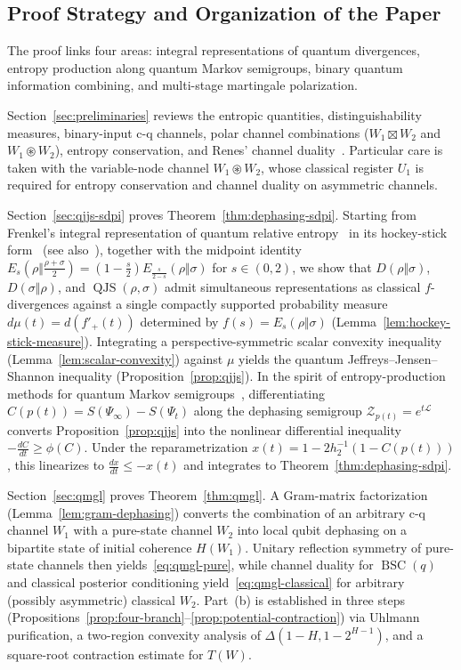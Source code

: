 \documentclass[10pt,a4paper]{article}
\numberwithin{equation}{section}
\theoremstyle{plain}
\theoremstyle{definition}
\theoremstyle{remark}
\DeclareMathOperator{\QJS}{QJS}
\DeclareMathOperator{\BSC}{BSC}
\newcommand{\cZ}{\mathcal{Z}}
\newcommand{\cL}{\mathcal{L}}
\begin{document}
\subsection{Proof Strategy and Organization of the Paper}

The proof links four areas: integral representations of quantum divergences, entropy production along quantum Markov semigroups, binary quantum information combining, and multi-stage martingale polarization.

Section~\ref{sec:preliminaries} reviews the entropic quantities, distinguishability measures, binary-input c-q channels, polar channel combinations ($W_1 \boxtimes W_2$ and $W_1 \circledast W_2$), entropy conservation, and Renes' channel duality~\cite{Renes2018}. Particular care is taken with the variable-node channel $W_1 \circledast W_2$, whose classical register $U_1$ is required for entropy conservation and channel duality on asymmetric channels.

Section~\ref{sec:qjjs-sdpi} proves Theorem~\ref{thm:dephasing-sdpi}. Starting from Frenkel's integral representation of quantum relative entropy~\cite{Frenkel2023} in its hockey-stick form~\cite{HircheTomamichel2024} (see also~\cite{BertaLamiTomamichel2024}), together with the midpoint identity $E_s(\rho \Vert \frac{\rho+\sigma}{2}) = (1 - \frac{s}{2}) E_{\frac{s}{2-s}}(\rho \Vert \sigma)$ for $s \in (0,2)$, we show that $D(\rho\Vert\sigma)$, $D(\sigma\Vert\rho)$, and $\QJS(\rho,\sigma)$ admit simultaneous representations as classical $f$-divergences against a single compactly supported probability measure $d\mu(t) = d(f'_+(t))$ determined by $f(s) = E_s(\rho\Vert\sigma)$ (Lemma~\ref{lem:hockey-stick-measure}). Integrating a perspective-symmetric scalar convexity inequality (Lemma~\ref{lem:scalar-convexity}) against $\mu$ yields the quantum Jeffreys--Jensen--Shannon inequality (Proposition~\ref{prop:qjjs}). In the spirit of entropy-production methods for quantum Markov semigroups~\cite{KastoryanoTemme2013,MullerHermesFrancaWolf2016,BeigiDattaRouze2020}, differentiating $C(p(t)) = S(\Psi_\infty) - S(\Psi_t)$ along the dephasing semigroup $\cZ_{p(t)} = e^{t\cL}$ converts Proposition~\ref{prop:qjjs} into the nonlinear differential inequality $-\frac{dC}{dt} \ge \phi(C)$. Under the reparametrization $x(t) = 1 - 2h_2^{-1}(1 - C(p(t)))$, this linearizes to $\frac{dx}{dt} \le -x(t)$ and integrates to Theorem~\ref{thm:dephasing-sdpi}.

Section~\ref{sec:qmgl} proves Theorem~\ref{thm:qmgl}. A Gram-matrix factorization (Lemma~\ref{lem:gram-dephasing}) converts the combination of an arbitrary c-q channel $W_1$ with a pure-state channel $W_2$ into local qubit dephasing on a bipartite state of initial coherence $H(W_1)$. Unitary reflection symmetry of pure-state channels then yields~\eqref{eq:qmgl-pure}, while channel duality for $\BSC(q)$ and classical posterior conditioning yield~\eqref{eq:qmgl-classical} for arbitrary (possibly asymmetric) classical $W_2$. Part~(b) is established in three steps (Propositions~\ref{prop:four-branch}--\ref{prop:potential-contraction}) via Uhlmann purification, a two-region convexity analysis of $\Delta(1 - H, 1 - 2^{H-1})$, and a square-root contraction estimate for $T(W)$.
\end{document}

